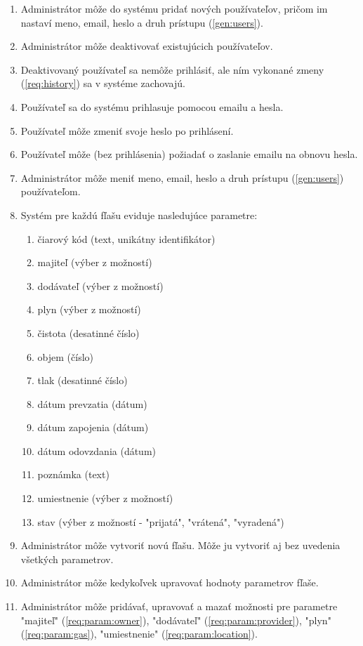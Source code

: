 \documentclass{zah}
\begin{document}
\begin{enumerate}
\item Administrátor môže do systému pridať nových používateľov, pričom im nastaví meno, email, heslo a druh prístupu (\ref{gen:users}).
\item Administrátor môže deaktivovať existujúcich používateľov.
\item Deaktivovaný používateľ sa nemôže prihlásiť, ale ním vykonané zmeny (\ref{req:history}) sa v systéme zachovajú.
\item Používateľ sa do systému prihlasuje pomocou emailu a hesla.
\item Používateľ môže zmeniť svoje heslo po prihlásení.
\item Používateľ môže (bez prihlásenia) požiadať o zaslanie emailu na obnovu hesla.
\item Administrátor môže meniť meno, email, heslo a druh prístupu (\ref{gen:users}) používateľom.
\item Systém pre každú fľašu eviduje nasledujúce parametre: 
\begin{enumerate}
	\tightlist
	\item čiarový kód (text, unikátny identifikátor)
	\item \label{req:param:owner} majiteľ (výber z možností)
	\item \label{req:param:provider} dodávateľ (výber z možností)
	\item \label{req:param:gas} plyn (výber z možností)
	\item čistota (desatinné číslo)
	\item objem (číslo)
	\item \label{req:param:pressure} tlak (desatinné číslo)
	\item dátum prevzatia (dátum)
	\item dátum zapojenia (dátum)
	\item dátum odovzdania (dátum)
	\item poznámka (text)
	\item \label{req:param:location} umiestnenie (výber z možností)
	\item stav (výber z možností - "prijatá", "vrátená", "vyradená")
\end{enumerate}
\item Administrátor môže vytvoriť novú fľašu. Môže ju vytvoriť aj bez uvedenia všetkých parametrov.
\item Administrátor môže kedykoľvek upravovať hodnoty parametrov fľaše.
\item Administrátor môže pridávať, upravovať a mazať možnosti pre parametre "majiteľ" (\ref{req:param:owner}), "dodávateľ" (\ref{req:param:provider}), "plyn" (\ref{req:param:gas}), "umiestnenie" (\ref{req:param:location}).

\end{enumerate}
\end{document}
